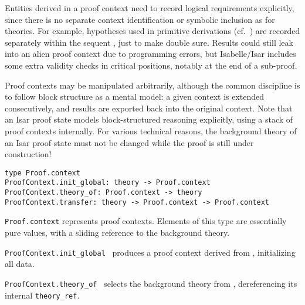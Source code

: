 \begin{isabellebody}
\begin{isamarkuptext}
  Entities derived in a proof context need to record logical
  requirements explicitly, since there is no separate context
  identification or symbolic inclusion as for theories.  For example,
  hypotheses used in primitive derivations (cf.\ )
  are recorded separately within the sequent \isa{{\isasymGamma}\ {\isasymturnstile}\ {\isasymphi}}, just to
  make double sure.  Results could still leak into an alien proof
  context due to programming errors, but Isabelle/Isar includes some
  extra validity checks in critical positions, notably at the end of a
  sub-proof.

  Proof contexts may be manipulated arbitrarily, although the common
  discipline is to follow block structure as a mental model: a given
  context is extended consecutively, and results are exported back
  into the original context.  Note that an Isar proof state models
  block-structured reasoning explicitly, using a stack of proof
  contexts internally.  For various technical reasons, the background
  theory of an Isar proof state must not be changed while the proof is
  still under construction!%
\end{isamarkuptext}%
\isamarkuptrue%
%
\isadelimmlref
%
\endisadelimmlref
%
\isatagmlref
%
\begin{isamarkuptext}%
\begin{mldecls}
  \verb|type Proof.context| \\
  \verb|ProofContext.init_global: theory -> Proof.context| \\
  \verb|ProofContext.theory_of: Proof.context -> theory| \\
  \verb|ProofContext.transfer: theory -> Proof.context -> Proof.context| \\
  \end{mldecls}

  \begin{description}

  \item \verb|Proof.context| represents proof contexts.  Elements
  of this type are essentially pure values, with a sliding reference
  to the background theory.

  \item \verb|ProofContext.init_global|~ produces a proof context
  derived from , initializing all data.

  \item \verb|ProofContext.theory_of|~ selects the
  background theory from , dereferencing its internal
  \verb|theory_ref|.


\end{description}
\end{isamarkuptext}
\end{isabellebody}
